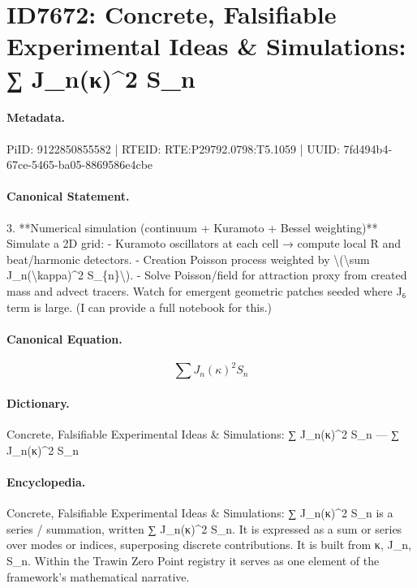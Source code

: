 \section*{ID7672: Concrete, Falsifiable Experimental Ideas \& Simulations: ∑ J\_n(κ)\textasciicircum{}2 S\_n}
\paragraph{Metadata.}
PiID: 9122850855582 | RTEID: RTE:P29792.0798:T5.1059 | UUID: 7fd494b4-67ce-5465-ba05-8869586e4cbe

\paragraph{Canonical Statement.}
3. **Numerical simulation (continuum + Kuramoto + Bessel weighting)** Simulate a 2D grid: - Kuramoto oscillators at each cell → compute local R and beat/harmonic detectors. - Creation Poisson process weighted by \textbackslash{}(\textbackslash{}sum J\_n(\textbackslash{}kappa)\textasciicircum{}2 S\_\{n\}\textbackslash{}). - Solve Poisson/field for attraction proxy from created mass and advect tracers. Watch for emergent geometric patches seeded where J₆ term is large. (I can provide a full notebook for this.)

\paragraph{Canonical Equation.}
\[
\sum J_n(\kappa)^2 S_{n}
\]

\paragraph{Dictionary.}
Concrete, Falsifiable Experimental Ideas \& Simulations: ∑ J\_n(κ)\textasciicircum{}2 S\_n — ∑ J\_n(κ)\textasciicircum{}2 S\_n

\paragraph{Encyclopedia.}
Concrete, Falsifiable Experimental Ideas \& Simulations: ∑ J\_n(κ)\textasciicircum{}2 S\_n is a series / summation, written ∑ J\_n(κ)\textasciicircum{}2 S\_n. It is expressed as a sum or series over modes or indices, superposing discrete contributions. It is built from κ, J\_n, S\_n. Within the Trawin Zero Point registry it serves as one element of the framework's mathematical narrative.
